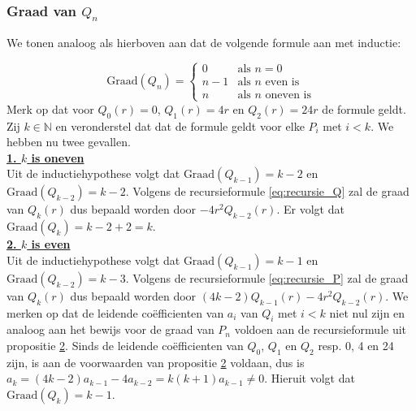 \documentclass[12pt,a4paper]{article}
\theoremstyle{definition}
\numberwithin{equation}{section}
\begin{document}
\subsubsection*{Graad van $Q_n$}
We tonen analoog als hierboven aan dat de volgende formule aan met inductie: 

\begin{equation*}
\text{Graad$(Q_n)=$}
\begin{cases}
  0 & \text{als $n=0$}\\
n-1 & \text{als $n$ even is}\\
n & \text{als $n$ oneven is}
\end{cases}
\end{equation*}
Merk op dat voor $Q_0(r) = 0$, $Q_1(r) = 4r$ en  $Q_2(r)=24r$ de formule geldt.
Zij $k\in\mathbb{N}$ en veronderstel dat dat de formule geldt voor elke $P_i$ met $i<k$. We hebben nu twee gevallen.\\
%
\underline{\textbf{1. $k$ is oneven}}\\
Uit de inductiehypothese volgt dat $\text{Graad}(Q_{k-1}) = k-2$ en $\text{Graad}(Q_{k-2}) = k-2$.
Volgens de recursieformule \eqref{eq:recursie_Q} zal de graad van $Q_k(r)$ dus bepaald worden door $-4r^2Q_{k-2}(r)$. Er volgt dat $\text{Graad}(Q_k) = k-2+2 = k.$
\\
\underline{\textbf{2. $k$ is even}}\\
Uit de inductiehypothese volgt dat $\text{Graad}(Q_{k-1}) = k-1$ en $\text{Graad}(Q_{k-2}) = k-3$.
Volgens de recursieformule \eqref{eq:recursie_P} zal de graad van $Q_k(r)$ dus bepaald worden door $(4k-2)Q_{k-1}(r)-4r^2Q_{k-2}(r)$. We merken op dat de leidende coëfficienten van $a_i$ van $Q_i$ met $i<k$  niet nul zijn en analoog aan het bewijs voor de graad van $P_n$ voldoen aan de recursieformule uit propositie \hyperref[thm:prop2]{2}.
Sinds de leidende coëfficienten van $Q_0$, $Q_1$ en $Q_2$ resp. 0, 4 en 24 zijn, is aan  de voorwaarden van propositie \hyperref[thm:prop2]{2} voldaan, dus is $a_k = (4k-2)a_{k-1} - 4a_{k-2} = k(k+1)a_{k-1} \neq 0$.
Hieruit volgt dat $\text{Graad}(Q_k) = k-1$.

\setcounter{section}{4}
\end{document}
